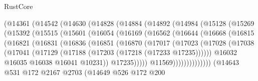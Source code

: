 \begin{lexlean}{RustCore}
\begin{coremodule}
              (@14361
                (@14542
                  (@14630
                    (@14828
                      (@14884
                        (@14892
                          (@14984
                            (@15128
                              (@15269
                                (@15392
                                  (@15515
                                    (@15601
                                      (@16054
                                        (@16169
                                          (@16562
                                            (@16644
                                              (@16668
                                                (@16815
                                                  (@16821
                                                    (@16831
                                                      (@16836
                                                        (@16851
                                                          (@16870
                                                            (@17017
                                                              (@17023
                                                                (@17028
                                                                  (@17038
                                                                    (@17041
                                                                      (@17129
                                                                        (@17188
                                                                          (@17203
                                                                            (@17218
                                                                              (@17233 @17235))))))
                                                                    @16032
                                                                    @16035
                                                                    @16038
                                                                    @16041
                                                                    @10231))
                                                                @17235)))))
                                                      @11569))))))))))))))
                          (@14643
                            @531
                            @172
                            @2167
                            @2703
                            (@14649
                              @526
                              @172
                              @200

\end{coremodule}
\end{lexlean}
